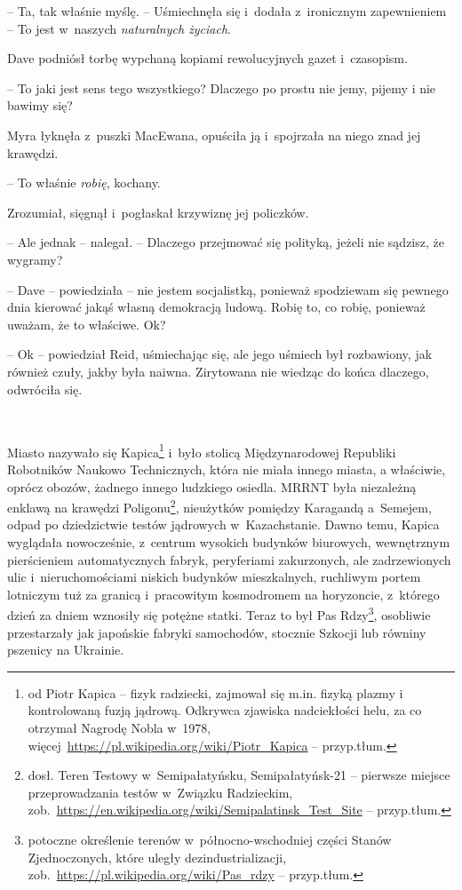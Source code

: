 \documentclass[oneside,polish,11pt,sfheadings]{mwbk}
\begin{document}
-- Ta, tak właśnie myślę. -- Uśmiechnęła się i~dodała z~ironicznym
zapewnieniem -- To jest w~naszych \textit{naturalnych życiach}.

Dave podniósł torbę wypchaną kopiami rewolucyjnych gazet i~czasopism. 

-- To jaki jest sens tego wszystkiego? Dlaczego po prostu nie jemy, pijemy
i nie bawimy się?

Myra łyknęła z~puszki MacEwana, opuściła ją i~spojrzała na niego znad
jej krawędzi. 

-- To właśnie \textit{robię}, kochany.

Zrozumiał, sięgnął i~pogłaskał krzywiznę jej policzków. 

-- Ale jednak -- nalegał. -- Dlaczego przejmować się polityką, jeżeli nie sądzisz, że
wygramy?

-- Dave -- powiedziała -- nie jestem socjalistką, ponieważ spodziewam się
pewnego dnia kierować jakąś własną demokracją ludową. Robię to, co
robię, ponieważ uważam, że to właściwe. Ok?

-- Ok -- powiedział Reid, uśmiechając się, ale jego uśmiech był
rozbawiony, jak również czuły, jakby była naiwna. Zirytowana nie wiedząc
do końca dlaczego, odwróciła się.

~

Miasto nazywało się Kapica\footnote{od Piotr Kapica -- 
fizyk radziecki, zajmował się m.in. fizyką plazmy i kontrolowaną fuzją jądrową. Odkrywca zjawiska nadciekłości helu, za co otrzymał
Nagrodę Nobla w~1978,
więcej~\url{https://pl.wikipedia.org/wiki/Piotr\_Kapica} -- przyp.tłum.} i~było stolicą Międzynarodowej Republiki
Robotników Naukowo \dywiz Technicznych, która nie miała innego miasta,
a właściwie, oprócz obozów, żadnego innego ludzkiego osiedla. MRRNT była
niezależną enklawą na krawędzi Poligonu\footnote{dosł. Teren Testowy w~Semipałatyńsku, Semipałatyńsk-21 -- pierwsze miejsce przeprowadzania
testów w~Związku Radzieckim,
zob.~\url{https://en.wikipedia.org/wiki/Semipalatinsk\_Test\_Site}
-- przyp.tłum.}, nieużytków pomiędzy Karagandą a~Semejem, odpad po dziedzictwie testów jądrowych w~Kazachstanie. Dawno
temu, Kapica wyglądała nowocześnie, z~centrum wysokich budynków
biurowych, wewnętrznym pierścieniem automatycznych fabryk, peryferiami
zakurzonych, ale zadrzewionych ulic i~nieruchomościami niskich budynków
mieszkalnych, ruchliwym portem lotniczym tuż za granicą i~pracowitym
kosmodromem na horyzoncie, z~którego dzień za dniem wznosiły się potężne
statki. Teraz to był Pas Rdzy\footnote{ potoczne określenie terenów w~północno-wschodniej części Stanów Zjednoczonych, które uległy
dezindustrializacji,
zob.~\url{https://pl.wikipedia.org/wiki/Pas\_rdzy} -- przyp.tłum.}, osobliwie przestarzały jak japońskie fabryki samochodów,
stocznie Szkocji lub równiny pszenicy na Ukrainie.
\end{document}

